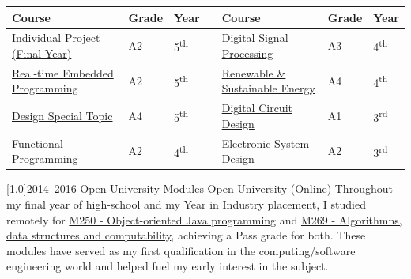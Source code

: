 \documentclass[]{cv-style}     %
\begin{document}
\begin{minipage}[b]{1.4\textwidth}
\begin{entrylist}
{\centering
\begin{tabular}{L{4.9cm}C{1cm}C{1cm} C{0.0cm}L{4.6cm}C{1cm}C{1cm}}
\toprule
\textbf{Course} & \textbf{Grade} & \textbf{Year} & & \textbf{Course} & \textbf{Grade} & \textbf{Year}\\ \midrule
 \href{https://www.gla.ac.uk/coursecatalogue/course/?code=ENG5041P}{Individual Project (Final Year)}             & A2         & 5\textsuperscript{th}       & & \href{https://www.gla.ac.uk/coursecatalogue/course/?code=ENG4053}{Digital Signal Processing}  & A3             & 4\textsuperscript{th}  \\ \midrule
 \href{https://www.gla.ac.uk/coursecatalogue/course/?code=ENG5220}{Real-time Embedded Programming}            & A2         & 5\textsuperscript{th}       & & \href{https://www.gla.ac.uk/coursecatalogue/course/?code=ENG4173}{Renewable \& Sustainable Energy}        & A4             & 4\textsuperscript{th}\\ \midrule
 \href{https://www.gla.ac.uk/coursecatalogue/course/?code=ENG5026}{Design Special Topic}             & A4         & 5\textsuperscript{th}       & & \href{https://www.gla.ac.uk/coursecatalogue/course/?code=UESTC3020}{Digital Circuit Design} & A1 & 3\textsuperscript{rd} \\ \midrule
 \href{https://www.gla.ac.uk/coursecatalogue/course/?code=COMPSCI4021}{Functional Programming}             & A2             & 4\textsuperscript{th}         & & \href{https://www.gla.ac.uk/coursecatalogue/course/?code=UESTC3003}{Electronic System Design} & A2 & 3\textsuperscript{rd}\\ \bottomrule
\end{tabular}

}
\vspace{0.2cm}


\entry
{\scalebox{.8}[1.0]{2014--2016}}
{Open University Modules}
{Open University (Online)}
{Throughout my final year of high-school and my Year in Industry placement, I studied remotely for  \href{https://www.open.ac.uk/courses/modules/m250}{M250 - Object-oriented Java programming} and \href{https://www.open.ac.uk/courses/modules/m269}{M269 - Algorithmns, data structures and computability}, achieving a Pass grade for both. These modules have served as my first qualification in the computing/software engineering world and helped fuel my early interest in the subject.   }

\vspace{0.2cm}


\end{entrylist}
\end{minipage}
\end{document}

